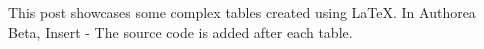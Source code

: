 This post showcases some complex tables created using LaTeX. In Authorea Beta, Insert - The source code is added after each table.

\newline